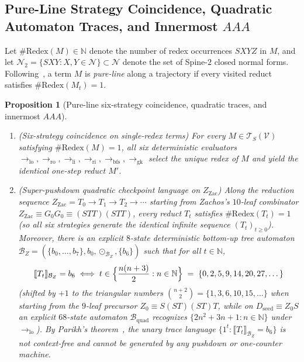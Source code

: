 \documentclass[11pt,reqno]{amsart}
\numberwithin{equation}{section}
\theoremstyle{plain}
\newtheorem{proposition}[theorem]{Proposition}
\theoremstyle{definition}
\theoremstyle{remark}
\begin{document}
\subsection{Pure-Line Strategy Coincidence, Quadratic Automaton Traces, and Innermost \texorpdfstring{$A A A$}{AAA}}
\label{subsec:pure-line-zachos}

Let $\#\mathrm{Redex}(M) \in \mathbb{N}$ denote the number of redex occurrences $S X Y Z$ in $M$, and let $\mathcal{N}_2 = \{ S X Y : X, Y \in \mathcal{N} \} \subset \mathcal{N}$ denote the set of Spine-$2$ closed normal forms. Following~\cite{BarendregtEndrullisKlopWaldmann2017}, a term $M$ is \emph{pure-line} along a trajectory if every visited reduct satisfies $\#\mathrm{Redex}(M_t) = 1$.

\begin{proposition}[Pure-line six-strategy coincidence, quadratic traces, and innermost $A A A$]
\label{prop:pure-line-and-aaa}
\begin{enumerate}[label=(\roman*)]
\item \emph{(Six-strategy coincidence on single-redex terms)} For every $M \in \mathcal{T}_S(\mathcal{V})$ satisfying $\#\mathrm{Redex}(M) = 1$, all six deterministic evaluators $\to_{\mathrm{lo}}, \to_{\mathrm{ro}}, \to_{\mathrm{li}}, \to_{\mathrm{ri}}, \to_{\mathrm{bfs}}, \to_{\mathrm{gk}}$ select the unique redex of $M$ and yield the identical one-step reduct $M'$.
\item \emph{(Super-pushdown quadratic checkpoint language on $Z_{\mathrm{Zac}}$)} Along the reduction sequence $Z_{\mathrm{Zac}} = T_0 \to T_1 \to T_2 \to \cdots$ starting from Zachos's $10$-leaf combinator $Z_{\mathrm{Zac}} \equiv G_0 G_0 \equiv (S T T)(S T T)$, every reduct $T_t$ satisfies $\#\mathrm{Redex}(T_t) = 1$ (so all six strategies generate the identical infinite sequence $(T_t)_{t \ge 0}$). Moreover, there is an explicit $8$-state deterministic bottom-up tree automaton $\mathcal{B}_Z = (\{b_0, \dots, b_7\}, b_0, \odot_{\mathcal{B}_Z}, \{b_6\})$ such that for all $t \in \mathbb{N}$,
\begin{equation}
\label{eq:zachos-milestones}
\llbracket T_t \rrbracket_{\mathcal{B}_Z} = b_6
\;\Longleftrightarrow\;
t \in \Bigl\{ \frac{n(n+3)}{2} : n \in \mathbb{N} \Bigr\}
\;=\; \{0, 2, 5, 9, 14, 20, 27, \dots\}
\end{equation}
(shifted by $+1$ to the triangular numbers $\binom{n+2}{2} = \{1, 3, 6, 10, 15, \dots\}$ when starting from the $9$-leaf precursor $Z_0 \equiv S(S T)(S T)T$, while on $D_{\mathrm{seed}} \equiv Z_0 S$ an explicit $68$-state automaton $\mathcal{B}_{\mathrm{quad}}$ recognizes $\{2n^2 + 3n + 1 : n \in \mathbb{N}\}$ under $\to_{\mathrm{lo}}$). By Parikh's theorem~\cite{Parikh1966}, the unary trace language $\{ 1^t : \llbracket T_t \rrbracket_{\mathcal{B}_Z} = b_6 \}$ is not context-free and cannot be generated by any pushdown or one-counter machine.

\end{enumerate}
\end{proposition}
\end{document}
